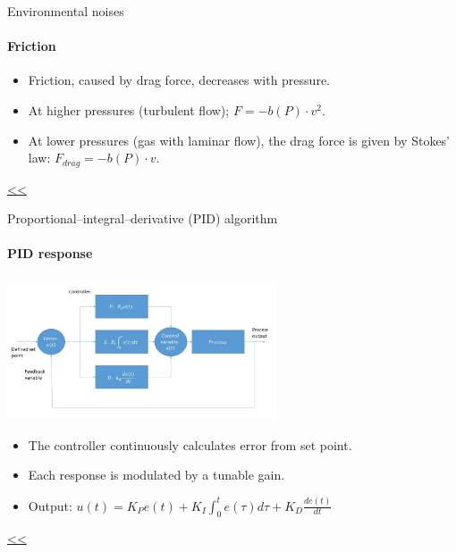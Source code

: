 \documentclass{beamer}
\begin{document}
\begin{frame}{\hypertarget{frame:Environmental noises 2}{Environmental noises}}
	\framesubtitle{Friction}
	\begin{itemize}
		\item Friction, caused by drag force, decreases with pressure.		
		\item At higher pressures (turbulent flow); $F = -b(P)\cdot v^2 $.
		\item At lower pressures (gas with laminar flow), the drag force is given by Stokes' law: $F_{drag} =  -b(P)\cdot v$.	
		
	\end{itemize}
	\hyperlink{frame:Environmental noises}{<<} 
\end{frame}

\begin{frame}{\hypertarget{frame:Proportional–integral–derivative (PID) algorithm 1}{Proportional–integral–derivative (PID) algorithm}}
	\framesubtitle{PID response}
	\begin{center}		
		\includegraphics[width=0.6\textwidth,keepaspectratio]{pid_diagram_powerpoint.jpg}
    \end{center}
	\begin{itemize}
		\item The controller continuously calculates error from set point. 
		\item Each response is modulated by a tunable gain. 
		\item Output: $u(t) = K_P e(t)+K_I\int_{0}^{t}e(\tau)d\tau+K_D\frac{de(t)}{dt}$		
	\end{itemize}
	\hyperlink{frame:Proportional–integral–derivative (PID) algorithm}{<<} 
\end{frame}
\end{document}
